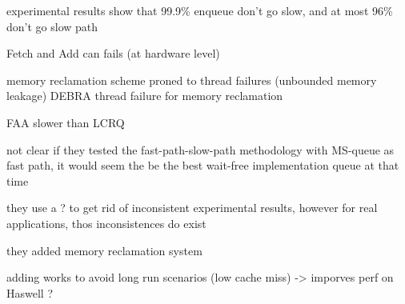 experimental results show that 99.9\% enqueue don't go slow, and at most 96\%
don't go slow path

Fetch and Add can fails (at hardware level)

memory reclamation scheme proned to thread failures (unbounded memory leakage)
DEBRA thread failure for memory reclamation

FAA slower than LCRQ

not clear if they tested the fast-path-slow-path methodology with MS-queue as
fast path, it would seem the be the best wait-free implementation queue at that
time

they use a ? to get rid of inconsistent experimental results, however for real
applications, thos inconsistences do exist

they added memory reclamation system

adding works to avoid long run scenarios (low cache miss) -> imporves perf on
Haswell ?
